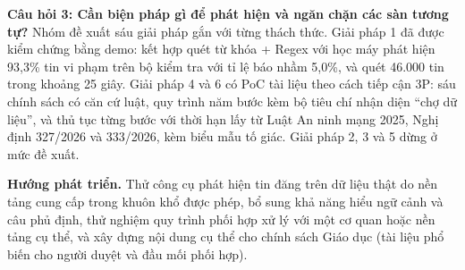 \textbf{Câu hỏi 3: Cần biện pháp gì để phát hiện và ngăn chặn các sàn tương tự?} Nhóm đề xuất sáu giải pháp gắn với từng thách thức. Giải pháp 1 đã được kiểm chứng bằng demo: kết hợp quét từ khóa + Regex với học máy phát hiện 93,3\% tin vi phạm trên bộ kiểm tra với tỉ lệ báo nhầm 5,0\%, và quét 46.000 tin trong khoảng 25 giây. Giải pháp 4 và 6 có PoC tài liệu theo cách tiếp cận 3P: sáu chính sách có căn cứ luật, quy trình năm bước kèm bộ tiêu chí nhận diện “chợ dữ liệu”, và thủ tục từng bước với thời hạn lấy từ Luật An ninh mạng 2025, Nghị định 327/2026 và 333/2026, kèm biểu mẫu tố giác. Giải pháp 2, 3 và 5 dừng ở mức đề xuất.

\textbf{Hướng phát triển.} Thử công cụ phát hiện tin đăng trên dữ liệu thật do nền tảng cung cấp trong khuôn khổ được phép, bổ sung khả năng hiểu ngữ cảnh và câu phủ định, thử nghiệm quy trình phối hợp xử lý với một cơ quan hoặc nền tảng cụ thể, và xây dựng nội dung cụ thể cho chính sách Giáo dục (tài liệu phổ biến cho người duyệt và đầu mối phối hợp).

